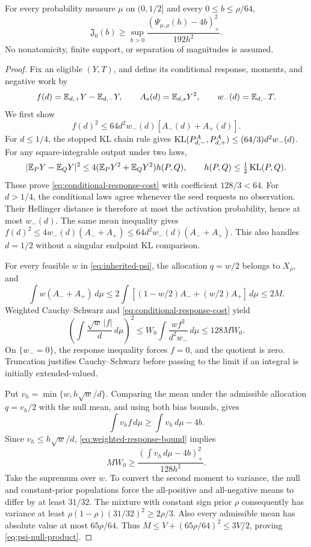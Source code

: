 \begin{proposition}
\label{prop:psi-null}
For every probability measure \(\mu\) on \((0,1/2]\) and every
\(0\le b\le\rho/64\),
\begin{equation}
 \mathfrak J_0(b)\ge
 \sup_{h>0}\frac{(\Psi_{\mu,\rho}(h)-4b)_+^2}{192h^2}.
 \label{eq:psi-null-product}
\end{equation}
No nonatomicity, finite support, or separation of magnitudes is assumed.
\end{proposition}

\begin{proof}
Fix an eligible \((Y,T)\), and define its conditional response, moments,
and negative work by
\[
 f(d)=\mathbb E_{d,+}Y-\mathbb E_{d,-}Y,\qquad
 A_s(d)=\mathbb E_{d,s}Y^2,\qquad w_-(d)=\mathbb E_{d,-}T.
\]
We first show
\begin{equation}
 f(d)^2\le64d^2w_-(d)[A_-(d)+A_+(d)].
 \label{eq:conditional-response-cost}
\end{equation}
For \(d\le1/4\), the stopped KL chain rule gives
\(\operatorname{KL}(P_{d,-}^A,P_{d,+}^A)\le(64/3)d^2w_-(d)\).
For any square-integrable output under two laws,
\[
 |\mathbb E_PY-\mathbb E_QY|^2
 \le4(\mathbb E_PY^2+\mathbb E_QY^2)h(P,Q),\qquad
 h(P,Q)\le\tfrac12\operatorname{KL}(P,Q).
\]
These prove \eqref{eq:conditional-response-cost} with coefficient
\(128/3<64\).  For \(d>1/4\), the conditional laws agree whenever
the seed requests no observation.  Their Hellinger distance is therefore
at most the activation probability, hence at most \(w_-(d)\).
The same mean inequality gives
\(f(d)^2\le4w_-(d)(A_-+A_+)\le64d^2w_-(d)(A_-+A_+)\).
This also handles \(d=1/2\) without a singular endpoint KL comparison.

For every feasible \(w\) in \eqref{eq:inherited-psi}, the allocation
\(q=w/2\) belongs to \(X_\rho\), and
\[
 \int w(A_-+A_+)\,d\mu
 \le2\int[(1-w/2)A_-+(w/2)A_+]\,d\mu\le2M.
\]
Weighted Cauchy--Schwarz and \eqref{eq:conditional-response-cost} yield
\begin{equation}
 \left(\int\frac{\sqrt w\,|f|}{d}\,d\mu\right)^2
 \le W_0\int\frac{wf^2}{d^2w_-}\,d\mu
 \le128MW_0.
 \label{eq:weighted-response-bound}
\end{equation}
On \(\{w_-=0\}\), the response inequality forces \(f=0\), and the
quotient is zero.  Truncation justifies Cauchy--Schwarz before passing to
the limit if an integral is initially extended-valued.

Put \(v_h=\min\{w,h\sqrt w/d\}\).  Comparing the mean under the
admissible allocation \(q=v_h/2\) with the null mean, and using both
bias bounds, gives
\[
 \int v_h f\,d\mu\ge\int v_h\,d\mu-4b.
\]
Since \(v_h\le h\sqrt w/d\),
\eqref{eq:weighted-response-bound} implies
\[
 MW_0\ge\frac{(\int v_h\,d\mu-4b)_+^2}{128h^2}.
\]
Take the supremum over \(w\).  To convert the second moment to variance,
the null and constant-prior populations force the all-positive and
all-negative means to differ by at least \(31/32\).  The mixture with
constant sign prior \(\rho\) consequently has variance at least
\(\rho(1-\rho)(31/32)^2\ge2\rho/3\).  Also every admissible mean has
absolute value at most \(65\rho/64\).  Thus
\(M\le V+(65\rho/64)^2\le3V/2\), proving
\eqref{eq:psi-null-product}.
\end{proof}

